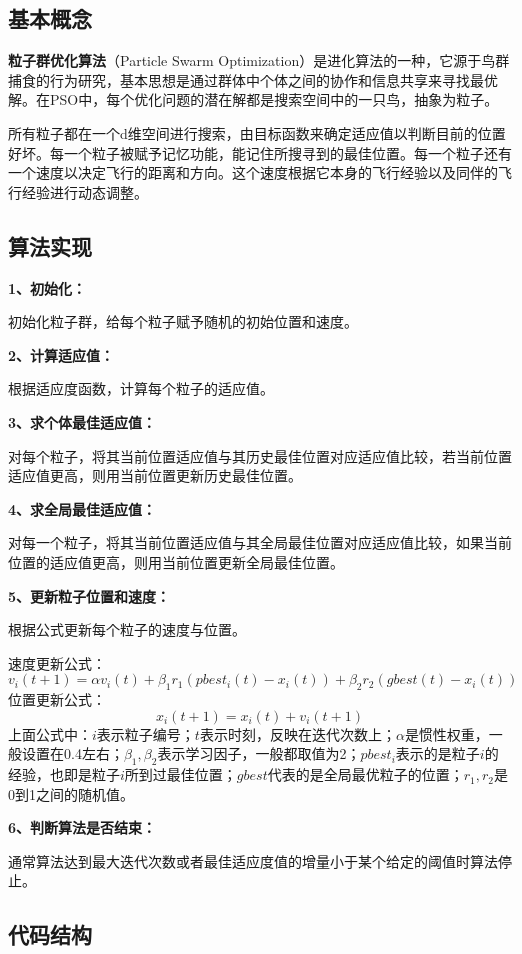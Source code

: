 \documentclass{article}
\begin{document}
\subsection{基本概念}
\textbf{粒子群优化算法}（Particle Swarm Optimization）是进化算法的一种，它源于鸟群捕食的行为研究，基本思想是通过群体中个体之间的协作和信息共享来寻找最优解。在PSO中，每个优化问题的潜在解都是搜索空间中的一只鸟，抽象为粒子。

所有粒子都在一个d维空间进行搜索，由目标函数来确定适应值以判断目前的位置好坏。每一个粒子被赋予记忆功能，能记住所搜寻到的最佳位置。每一个粒子还有一个速度以决定飞行的距离和方向。这个速度根据它本身的飞行经验以及同伴的飞行经验进行动态调整。

\subsection{算法实现}
\textbf{1、初始化：}

初始化粒子群，给每个粒子赋予随机的初始位置和速度。

\textbf{2、计算适应值：}

根据适应度函数，计算每个粒子的适应值。

\textbf{3、求个体最佳适应值：}

对每个粒子，将其当前位置适应值与其历史最佳位置对应适应值比较，若当前位置适应值更高，则用当前位置更新历史最佳位置。

\textbf{4、求全局最佳适应值：}

对每一个粒子，将其当前位置适应值与其全局最佳位置对应适应值比较，如果当前位置的适应值更高，则用当前位置更新全局最佳位置。

\textbf{5、更新粒子位置和速度：}

根据公式更新每个粒子的速度与位置。

速度更新公式：
$$v_i(t+1)=\alpha v_i(t)+\beta_1r_1(pbest_i(t)-x_i(t))+\beta_2r_2(gbest(t)-x_i(t))$$
位置更新公式：
$$x_i(t+1)=x_i(t)+v_i(t+1)$$
上面公式中：$i$表示粒子编号；$t$表示时刻，反映在迭代次数上；$\alpha$是惯性权重，一般设置在0.4左右；$\beta_1,\beta_2$表示学习因子，一般都取值为2；$pbest_i$表示的是粒子$i$的经验，也即是粒子$i$所到过最佳位置；$gbest$代表的是全局最优粒子的位置；$r_1,r_2$是0到1之间的随机值。

\textbf{6、判断算法是否结束：}

通常算法达到最大迭代次数或者最佳适应度值的增量小于某个给定的阈值时算法停止。

\subsection{代码结构}
\end{document}
